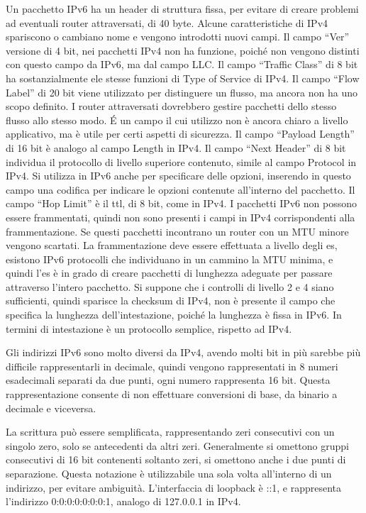 \documentclass{article}
\numberwithin{equation}{subsection}
\begin{document}
Un pacchetto IPv6 ha un header di struttura fissa, per evitare di creare problemi ad eventuali router attraversati, di 40 byte. Alcune caratteristiche di IPv4 
spariscono o cambiano nome e vengono introdotti nuovi campi. 
Il campo ``Ver'' versione di 4 bit, nei pacchetti IPv4 non ha funzione, poiché non vengono distinti con questo campo da IPv6, ma dal campo LLC. Il campo ``Traffic Class'' 
di 8 bit ha sostanzialmente ele stesse funzioni di Type of Service di IPv4. Il campo ``Flow Label'' di 20 bit viene utilizzato per distinguere un flusso, ma ancora non 
ha uno scopo definito. I router attraversati dovrebbero gestire pacchetti dello stesso flusso allo stesso modo. \'{E} un campo il cui utilizzo non è ancora 
chiaro a livello applicativo, ma è utile per certi aspetti di sicurezza. Il campo ``Payload Length'' di 16 bit è analogo al campo Length in IPv4. Il campo 
``Next Header'' di 8 bit individua il protocollo di livello superiore contenuto, simile al campo Protocol in IPv4. Si utilizza in IPv6 anche per specificare delle 
opzioni, inserendo in questo campo una codifica per indicare le opzioni contenute all'interno del pacchetto. %
Il campo ``Hop Limit'' è il ttl, di 8 bit, come in IPv4. I pacchetti IPv6 non possono essere frammentati, quindi non sono presenti i campi in IPv4 corrispondenti alla 
frammentazione. Se questi pacchetti incontrano un router con un MTU minore vengono scartati. La frammentazione deve essere effettuata a livello degli es, esistono 
IPv6 protocolli che individuano in un cammino la MTU minima, e quindi l'es è in grado di creare pacchetti di lunghezza adeguate per passare attraverso l'intero pacchetto. 
Si suppone che i controlli di livello 2 e 4 siano sufficienti, quindi sparisce la checksum di IPv4, non è presente il campo che specifica la lunghezza dell'intestazione, poiché 
la lunghezza è fissa in IPv6. In termini di intestazione è un protocollo semplice, rispetto ad IPv4. 

Gli indirizzi IPv6 sono molto diversi da IPv4, avendo molti bit in più sarebbe più difficile rappresentarli in decimale, quindi vengono rappresentati in 8 numeri 
esadecimali separati da due punti, ogni numero rappresenta 16 bit. Questa rappresentazione consente di non effettuare conversioni di base, da binario a decimale e viceversa. 

La scrittura può essere semplificata, rappresentando zeri consecutivi con un singolo zero, solo se antecedenti da altri zeri. Generalmente si omettono 
gruppi consecutivi di 16 bit contenenti soltanto zeri, si omettono anche i due punti di separazione. Questa notazione è utilizzabile una sola volta all'interno di 
un indirizzo, per evitare ambiguità. L'interfaccia di loopback è ::1, e rappresenta l'indirizzo 0:0:0:0:0:0:0:1, analogo di 127.0.0.1 in IPv4. 
\end{document}
